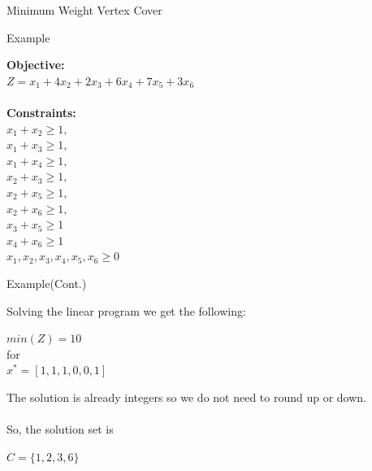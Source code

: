 \documentclass[xcolor=svgnames]{beamer}
\begin{document}
\begin{section}{Minimum Weight Vertex Cover}
\begin{frame}{Example}
\begin{minipage}
        \end{minipage}
        \hfill
        \pause
        \begin{minipage}
            {0.45\textwidth}
            \centering
            \textbf{Objective:}
            \\
            $Z=x_1+4x_2+2x_3+6x_4+7x_5+3x_6$
            \\
            \vspace{5pt}
            \\
            \textbf{Constraints:}
            \\
            $x_1+x_2\geq1,$\\
            $x_1+x_3\geq1,$\\
            $x_1+x_4\geq1,$\\
            $x_2+x_3\geq1,$\\
            $x_2+x_5\geq1,$\\
            $x_2+x_6\geq1,$\\
            $x_3+x_5\geq1$\\
            $x_4+x_6\geq1$\\
            $x_1,x_2,x_3,x_4,x_5,x_6\geq0$
        \end{minipage}
    \end{frame}
    \begin{frame}{Example(Cont.)}
        \begin{minipage}
            {0.45\textwidth}
            Solving the linear program we get the following:
            \begin{center}
                $min(Z)=10$ \\ for \\ $x^*=[1,1,1,0,0,1]$\\
            \end{center}
            The solution is already integers so we do not need to round up or down.\\
            \\
            So, the solution set is 
            \begin{center}
                $C=\{1,2,3,6\}$
            \end{center}
            

\end{minipage}
\end{frame}
\end{section}
\end{document}
